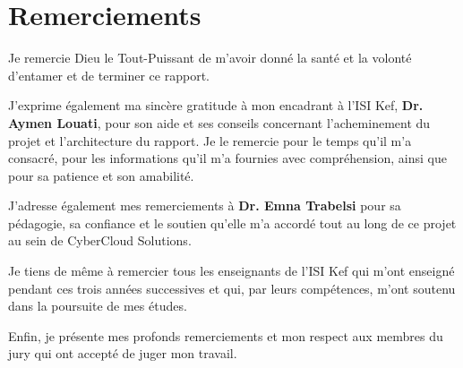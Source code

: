 \chapter*{Remerciements}

Je remercie Dieu le Tout-Puissant de m’avoir donné la santé et la volonté d’entamer et de terminer ce rapport.

J’exprime également ma sincère gratitude à mon encadrant à l’ISI Kef, \textbf{Dr. Aymen Louati}, pour son aide et ses conseils concernant l’acheminement du projet et l’architecture du rapport. Je le remercie pour le temps qu’il m’a consacré, pour les informations qu’il m’a fournies avec compréhension, ainsi que pour sa patience et son amabilité.

J’adresse également mes remerciements à \textbf{Dr. Emna Trabelsi} pour sa pédagogie, sa confiance et le soutien qu’elle m’a accordé tout au long de ce projet au sein de CyberCloud Solutions.

Je tiens de même à remercier tous les enseignants de l’ISI Kef qui m’ont enseigné pendant ces trois années successives et qui, par leurs compétences, m’ont soutenu dans la poursuite de mes études.

Enfin, je présente mes profonds remerciements et mon respect aux membres du jury qui ont accepté de juger mon travail.
